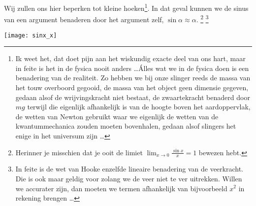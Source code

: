 \documentclass{ximera}
\begin{document}
	Wij zullen ons hier beperken tot kleine hoeken\footnote{Ik weet het, dat doet pijn aan het wiskundig exacte deel van ons hart, maar in feite is het in de fysica nooit anders \ldots \'Alles wat we in de fysica doen is een benadering van de realiteit. Zo hebben we bij onze slinger reeds de massa van het touw overboord gegooid, de massa van het object geen dimensie gegeven, gedaan alsof de wrijvingskracht niet bestaat, de zwaartekracht benaderd door $mg$ terwijl die eigenlijk afhankelijk is van de hoogte boven het aardoppervlak, de wetten van Newton gebruikt waar we eigenlijk de wetten van de kwantummechanica zouden moeten bovenhalen, gedaan alsof slingers het enige in het universum zijn \ldots }. In dat geval kunnen we de sinus van een argument benaderen door het argument zelf, $\sin\alpha\approx\alpha$. \footnote{Herinner je misschien dat je ooit de limiet $\displaystyle\lim_{x\rightarrow0}\frac{\sin x}{x}=1$ bewezen hebt.} \footnote{In feite is de wet van Hooke enzelfde lineaire benadering van de veerkracht. Die is ook maar geldig voor zolang we de veer niet te ver uitrekken. Willen we accurater zijn, dan moeten we termen afhankelijk van bijvoorbeeld $x^2$ in rekening brengen \ldots}
	\begin{image}
	
	\texttt{[image: sinx\_x]}
	\end{image}
	
\end{document}
